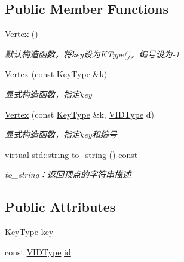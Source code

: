 \subsection*{Public Member Functions}
\begin{DoxyCompactItemize}
\item 
\hyperlink{struct_introduction_to_algorithm_1_1_graph_algorithm_1_1_vertex_a6a0b0403db78f786443e8827e6bb6af9}{Vertex} ()
\begin{DoxyCompactList}\small\item\em 默认构造函数，将{\ttfamily key}设为{\ttfamily K\+Type()}，编号设为-\/1 \end{DoxyCompactList}\item 
\hyperlink{struct_introduction_to_algorithm_1_1_graph_algorithm_1_1_vertex_a047edb0a5351588129aad113a93eba54}{Vertex} (const \hyperlink{struct_introduction_to_algorithm_1_1_graph_algorithm_1_1_vertex_a14e958c58a404474853491eb811954cc}{Key\+Type} \&k)
\begin{DoxyCompactList}\small\item\em 显式构造函数，指定{\ttfamily key} \end{DoxyCompactList}\item 
\hyperlink{struct_introduction_to_algorithm_1_1_graph_algorithm_1_1_vertex_a9ed1eda4a4b48a8329acc8bd4b58150f}{Vertex} (const \hyperlink{struct_introduction_to_algorithm_1_1_graph_algorithm_1_1_vertex_a14e958c58a404474853491eb811954cc}{Key\+Type} \&k, \hyperlink{struct_introduction_to_algorithm_1_1_graph_algorithm_1_1_vertex_a290c84c0dcf159f833c72c47a2d4d44a}{V\+I\+D\+Type} d)
\begin{DoxyCompactList}\small\item\em 显式构造函数，指定{\ttfamily key}和编号 \end{DoxyCompactList}\item 
virtual std\+::string \hyperlink{struct_introduction_to_algorithm_1_1_graph_algorithm_1_1_vertex_aa8b0ab227cd3945eace9ef55f8837925}{to\+\_\+string} () const 
\begin{DoxyCompactList}\small\item\em to\+\_\+string：返回顶点的字符串描述 \end{DoxyCompactList}\end{DoxyCompactItemize}
\subsection*{Public Attributes}
\begin{DoxyCompactItemize}
\item 
\hyperlink{struct_introduction_to_algorithm_1_1_graph_algorithm_1_1_vertex_a14e958c58a404474853491eb811954cc}{Key\+Type} \hyperlink{struct_introduction_to_algorithm_1_1_graph_algorithm_1_1_vertex_a5bcfb4e0ba9450b8ebb2543069772d1f}{key}
\item 
const \hyperlink{struct_introduction_to_algorithm_1_1_graph_algorithm_1_1_vertex_a290c84c0dcf159f833c72c47a2d4d44a}{V\+I\+D\+Type} \hyperlink{struct_introduction_to_algorithm_1_1_graph_algorithm_1_1_vertex_a76668b285452856d184a245b7b35b7c1}{id}
\end{DoxyCompactItemize}


